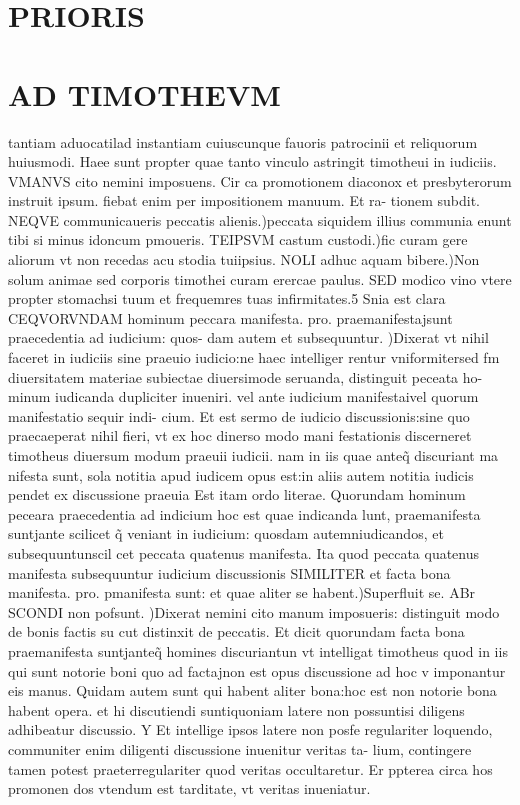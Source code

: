 \documentclass{article}
\begin{document}
\begin{pages}
\section*{PRIORIS }
\section*{AD TIMOTHEVM }\pstart tantiam aduocatilad instantiam cuiuscunque fauoris patrocinii et reliquorum huiusmodi. Haee sunt propter quae tanto vinculo astringit timotheui in iudiciis. VMANVS cito nemini imposuens. Cir ca promotionem diaconox et presbyterorum instruit ipsum. fiebat enim per impositionem manuum. Et ra- tionem subdit. NEQVE communicaueris peccatis alienis.)peccata siquidem illius communia enunt tibi si minus idoncum pmoueris. TEIPSVM castum custodi.)fic curam gere aliorum vt non recedas acu stodia tuiipsius. NOLI adhuc aquam bibere.)Non solum animae sed corporis timothei curam erercae paulus. SED modico vino vtere propter stomachsi tuum et frequemres tuas infirmitates.5 Snia est clara CEQVORVNDAM hominum peccara manifesta. pro. praemanifestajsunt praecedentia ad iudicium: quos- dam autem et subsequuntur. )Dixerat vt nihil faceret in iudiciis sine praeuio iudicio:ne haec intelliger rentur vniformitersed fm diuersitatem materiae subiectae diuersimode seruanda, distinguit peceata ho- minum iudicanda dupliciter inueniri. vel ante iudicium manifestaivel quorum manifestatio sequir indi- cium. Et est sermo de iudicio discussionis:sine quo praecaeperat nihil fieri, vt ex hoc dinerso modo mani festationis discerneret timotheus diuersum modum praeuii iudicii. nam in iis quae anteq̃ discuriant ma nifesta sunt, sola notitia apud iudicem opus est:in aliis autem notitia iudicis pendet ex discussione praeuia Est itam ordo literae. Quorundam hominum peceara praecedentia ad indicium hoc est quae indicanda lunt, praemanifesta suntjante scilicet q̃ veniant in iudicium: quosdam autemniudicandos, et subsequuntunscil cet peccata quatenus manifesta. Ita quod peccata quatenus manifesta subsequuntur iudicium discussionis SIMILITER et facta bona manifesta. pro. pmanifesta sunt: et quae aliter se habent.)Superfluit se. ABr SCONDI non pofsunt. )Dixerat nemini cito manum imposueris: distinguit modo de bonis factis su cut distinxit de peccatis. Et dicit quorundam facta bona praemanifesta suntjanteq̃ homines discuriantun vt intelligat timotheus quod in iis qui sunt notorie boni quo ad factajnon est opus discussione ad hoc v imponantur eis manus. Quidam autem sunt qui habent aliter bona:hoc est non notorie bona habent opera. et hi discutiendi suntiquoniam latere non possuntisi diligens adhibeatur discussio. Y Et intellige ipsos latere non posfe regulariter loquendo, communiter enim diligenti discussione inuenitur veritas ta- lium, contingere tamen potest praeterregulariter quod veritas occultaretur. Er ppterea circa hos promonen dos vtendum est tarditate, vt veritas inueniatur.  \pend

\end{pages}
\end{document}
